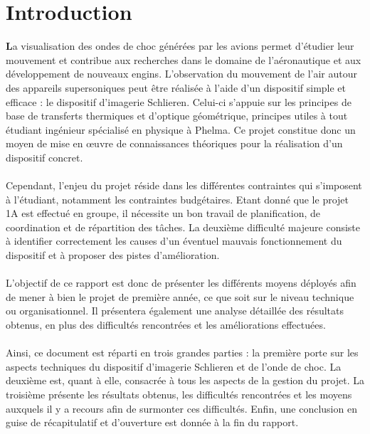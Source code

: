 \section*{Introduction}
\textbf{L}a visualisation des ondes de choc générées par les avions permet d’étudier leur mouvement et contribue aux recherches dans le domaine de l’aéronautique et aux développement de nouveaux engins. L’observation du mouvement de l’air autour des appareils supersoniques peut être réalisée à l’aide d’un dispositif simple et efficace : le dispositif d’imagerie Schlieren. Celui-ci s’appuie sur les principes de base de transferts thermiques et d’optique géométrique,  principes utiles à tout étudiant ingénieur spécialisé en physique à Phelma. Ce projet constitue donc un moyen de mise en œuvre de connaissances théoriques pour la réalisation d’un dispositif concret.
\\
\\
Cependant, l’enjeu du projet réside dans les différentes contraintes qui s’imposent à l’étudiant, notamment les contraintes budgétaires. Etant donné que le projet 1A est effectué en groupe, il nécessite un bon travail de planification, de coordination et de répartition des tâches. La deuxième difficulté majeure consiste à identifier correctement les causes d’un éventuel mauvais fonctionnement du dispositif et à proposer des pistes d’amélioration.
\\
\\
L’objectif de ce rapport est donc de présenter les différents moyens déployés afin de mener à bien le projet de première année, ce que soit sur le niveau technique ou organisationnel. Il présentera également une analyse détaillée des résultats obtenus, en plus des difficultés rencontrées et les améliorations effectuées.
\\
\\
Ainsi, ce document est réparti en trois grandes parties : la première porte sur les aspects techniques du dispositif d’imagerie Schlieren et de l’onde de choc. La deuxième est, quant à elle, consacrée à tous les aspects de la gestion du projet. La troisième présente les résultats obtenus, les difficultés rencontrées et les moyens auxquels il y a recours afin de surmonter ces difficultés. Enfin, une conclusion en guise de récapitulatif et d’ouverture est donnée à la fin du rapport.
